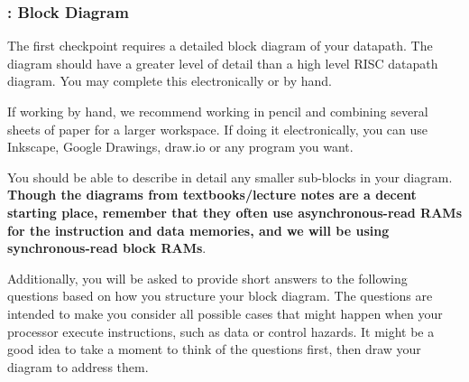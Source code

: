 \documentclass[11pt]{article}
\begin{document}
\subsubsection{\blockDiagramTaskName: Block Diagram}
The first checkpoint requires a detailed block diagram of your datapath.
The diagram should have a greater level of detail than a high level RISC datapath diagram.
You may complete this electronically or by hand.

If working by hand, we recommend working in pencil and combining several sheets of paper for a larger workspace.
If doing it electronically, you can use Inkscape, Google Drawings, draw.io or any program you want.

You should be able to describe in detail any smaller sub-blocks in your diagram.
\textbf{Though the diagrams from textbooks/lecture notes are a decent starting place, remember that they often use asynchronous-read RAMs for the instruction and data memories, and we will be using synchronous-read block RAMs}.

Additionally, you will be asked to provide short answers to the following questions based on how you structure your block diagram. The questions are intended to make you consider all possible cases that might happen when your processor execute instructions, such as data or control hazards. It might be a good idea to take a moment to think of the questions first, then draw your diagram to address them.
\end{document}
